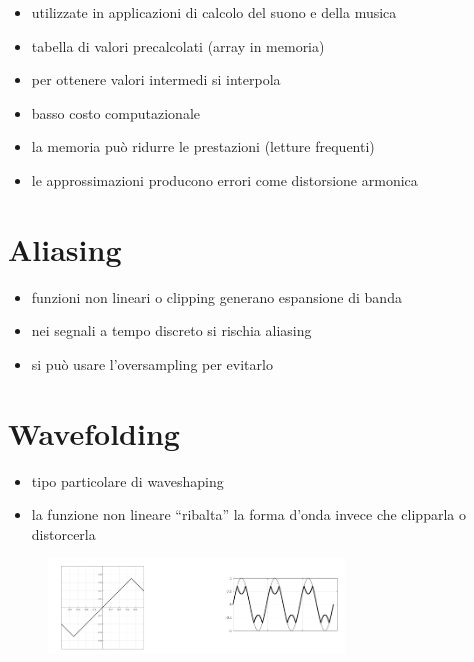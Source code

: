 \begin{itemize}
    \item utilizzate in applicazioni di calcolo del suono e della musica
    \item tabella di valori precalcolati (array in memoria)
    \item per ottenere valori intermedi si interpola
    \item basso costo computazionale
    \item la memoria può ridurre le prestazioni (letture frequenti)
    \item le approssimazioni producono errori come distorsione armonica
\end{itemize}

\section*{Aliasing}

\begin{itemize}
    \item funzioni non lineari o clipping generano espansione di banda
    \item nei segnali a tempo discreto si rischia aliasing
    \item si può usare l’oversampling per evitarlo
\end{itemize}

\section*{Wavefolding}

\begin{itemize}
    \item tipo particolare di waveshaping
    \item la funzione non lineare “ribalta” la forma d’onda invece che clipparla o distorcerla
\end{itemize}

\begin{figure}[H]
    \centering
    \includegraphics[width=0.7\textwidth]{capitoli/capitolo11/immagini/image3.png}
\end{figure}
